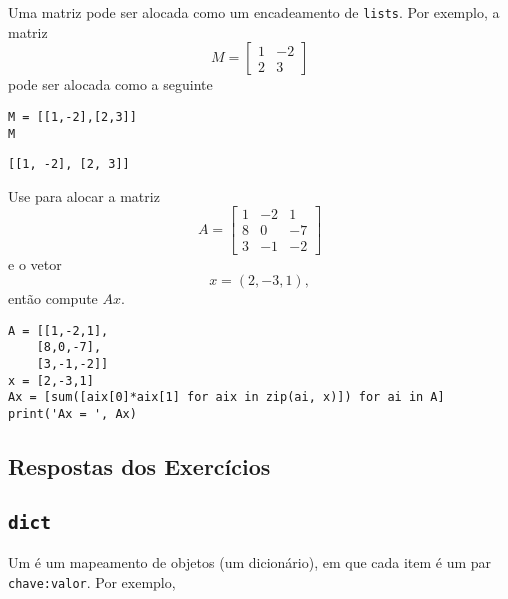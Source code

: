 \begin{exer}
  Uma matriz pode ser alocada como um encadeamento de \texttt{lists}. Por exemplo, a matriz
  \begin{equation}
    M =
    \begin{bmatrix}
      1 & -2 \\
      2 & 3
    \end{bmatrix}
  \end{equation}
  pode ser alocada como a seguinte {\PYTHONlist}

\begin{lstlisting}
M = [[1,-2],[2,3]]
M
\end{lstlisting}

\begin{verbatim}
[[1, -2], [2, 3]]
\end{verbatim}

  Use {\PYTHONlist} para alocar a matriz
  \begin{equation}
    A =
    \begin{bmatrix}
      1 & -2 & 1\\
      8 & 0 & -7\\
      3 & -1 & -2
    \end{bmatrix}
  \end{equation}
  e o vetor
  \begin{equation}
    x = (2, -3, 1),
  \end{equation}
  então compute $Ax$.
\end{exer}
\begin{resp}

\begin{lstlisting}
A = [[1,-2,1],
    [8,0,-7],
    [3,-1,-2]]
x = [2,-3,1]
Ax = [sum([aix[0]*aix[1] for aix in zip(ai, x)]) for ai in A]
print('Ax = ', Ax)
\end{lstlisting}

\end{resp}

\ifisbook 
\subsection*{Respostas dos Exercícios}
\shipoutAnswer
\fi


\subsection{\texttt{dict}}

Um {\PYTHONdict} é um mapeamento de objetos (um dicionário), em que cada item é um par \texttt{chave:valor}. Por exemplo,

